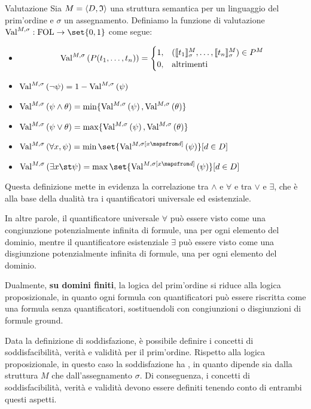 \begin{definition}{Valutazione}
Sia \(M = \langle D, \mathfrak{I} \rangle\) una struttura semantica per un linguaggio del prim'ordine e \(\sigma\) un assegnamento. Definiamo la funzione di valutazione \(\Val{M,\sigma}: \FOL \to \set{0,1}\) come segue:
\begin{itemize}
  \item \[\Val{M,\sigma}[P(t_1,\ldots,t_n)] = \begin{cases}
    1, & (\den{t_1}[M][\sigma], \ldots, \den{t_n}[M][\sigma]) \in P^M \\
    0, & \text{altrimenti}
  \end{cases}\]
  \item \(\Val{M,\sigma}[\neg \psi] = 1 - \Val{M,\sigma}[\psi]\)
  \item \(\Val{M,\sigma}[\psi\land\theta] = \min\{\Val{M,\sigma}[\psi], \Val{M,\sigma}[\theta]\}\)
  \item \(\Val{M,\sigma}[\psi\lor\theta] = \max\{\Val{M,\sigma}[\psi], \Val{M,\sigma}[\theta]\}\)
  \item \(\Val{M,\sigma}[\forall x, \psi] = \min \set{\Val{M,\sigma[x \mapsfrom d]}[\psi] }[ d\in D]\)
  \item \(\Val{M,\sigma}[\exists x\st \psi] = \max \set{\Val{M,\sigma[x \mapsfrom d]}[\psi] }[ d\in D]\)
\end{itemize}
\end{definition}

Questa definizione mette in evidenza la correlazione tra \(\land\) e \(\forall\) e tra \(\lor\) e \(\exists\), che è alla base della dualità tra i quantificatori universale ed esistenziale.

In altre parole, il quantificatore universale \(\forall\) può essere visto come una congiunzione potenzialmente infinita di formule, una per ogni elemento del dominio, mentre il quantificatore esistenziale \(\exists\) può essere visto come una disgiunzione potenzialmente infinita di formule, una per ogni elemento del dominio.

Dualmente, \textbf{su domini finiti}, la logica del prim'ordine si riduce alla logica proposizionale, in quanto ogni formula con quantificatori può essere riscritta come una formula senza quantificatori, sostituendoli con congiunzioni o disgiunzioni di formule ground.

Data la definizione di soddisfazione, è possibile definire i concetti di soddisfacibilità, verità e validità per il prim'ordine. Rispetto alla logica proposizionale, in questo caso la soddisfazione ha , in quanto dipende sia dalla struttura \(M\) che dall'assegnamento \(\sigma\). Di conseguenza, i concetti di soddisfacibilità, verità e validità devono essere definiti tenendo conto di entrambi questi aspetti.

